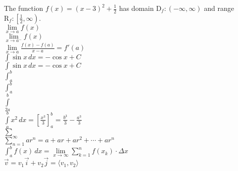 \documentclass[12pt]{article}
\begin{document}
The function $f(x)=(x-3)^2+\frac{1}{2}$ has domain $\mathrm{D}_f:(-\infty, \infty)$ and range $\mathrm{R}_f:\left[\frac{1}{2}, \infty \right)$.\\

$\lim \limits_{x \to a} f(x)$ \\

$\lim \limits_{x \to a^-} f(x)$ \\

$\displaystyle{\lim \limits_{x \to a} \frac{f(x)-f(a)}{x-a}=f'(a)}$ \\

$\int \sin x\,dx = -\cos x+C$ \\

$\displaystyle{\int \sin x\,dx = -\cos x+C}$ \\

$\int_a^b$ \\

$\displaystyle{\int_a^b}$ \\

$\int \limits_{2a}^{b}$ \\

$\displaystyle{\int \limits_{a}^{b}x^2\,dx=\left[\frac{x^3}{3}\right]_{a}^{b}=\frac{b^3}{3}-\frac{a^3}{3}}$ \\

$\sum$ \\

$\displaystyle{\sum \limits_{n=1}^{\infty}ar^n=a+ar+ar^2+\cdots+ar^n}$ \\

$\displaystyle{\int_a^b f(x)\,dx=\lim \limits_{x \to \infty}\sum \limits_{k=1}^{n}f(x_k) \cdot \Delta x}$ \\

$\vec{v}=v_1 \vec{i}+v_2 \vec{j}=\langle v_1, v_2\rangle$
\end{document}
